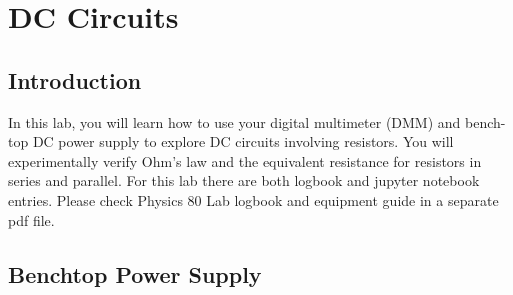 \chapter{DC Circuits}


\section{Introduction}

In this lab, you will learn how to use your digital multimeter (DMM) and bench-top DC power supply to explore DC circuits involving
resistors.  You will experimentally verify Ohm's law and the equivalent resistance for resistors in series and parallel. For this lab there are both logbook and jupyter notebook entries. Please check Physics 80 Lab logbook and equipment guide in a separate pdf file. 




\section{Benchtop Power Supply}


